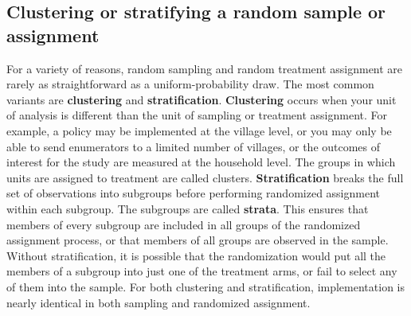 
\subsection{Clustering or stratifying a random sample or assignment}

For a variety of reasons, random sampling and random treatment assignment
are rarely as straightforward as a uniform-probability draw.
The most common variants are \textbf{clustering} and \textbf{stratification}.\cite{athey2017econometrics}
\textbf{Clustering} occurs when your unit of analysis is different
than the unit of sampling or treatment assignment.
For example, a policy may be implemented at the village level,
or you may only be able to send enumerators to a limited number of villages,
or the outcomes of interest for the study are measured at the household level.
The groups in which units are assigned to treatment are called clusters.
\textbf{Stratification} breaks the full set of observations into subgroups
before performing randomized assignment within each subgroup.
The subgroups are called \textbf{strata}.
This ensures that members of every subgroup
are included in all groups of the randomized assignment process,
or that members of all groups are observed in the sample.
Without stratification, it is possible that the randomization
would put all the members of a subgroup into just one of the treatment arms,
or fail to select any of them into the sample.
For both clustering and stratification,
implementation is nearly identical in both sampling and randomized assignment.

